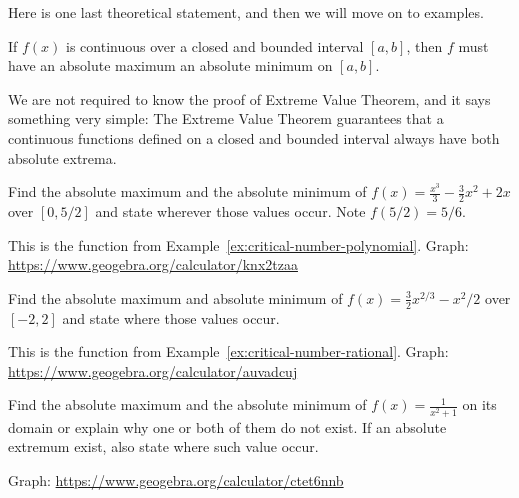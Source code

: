 \documentclass[../main.tex]{subfiles}
\begin{document}
  \medskip{}
  Here is one last theoretical statement, and then we will move on to examples. 

  \begin{mdframed}[style=withref-compact]
    If \(f(x)\) is continuous over a closed and bounded interval \([a,b]\), then \(f\) must have an absolute maximum  an absolute minimum on \([a,b]\).

  \end{mdframed}
  We are not required to know the proof of Extreme Value Theorem, and it says something very simple: The Extreme Value Theorem guarantees that a continuous functions defined on a closed and bounded interval always have both absolute extrema.
  \clearpage

  \begin{example} \label{ex:closed-interval-method-intro}
    Find the absolute maximum and the absolute minimum of \(f(x) = \frac{x^{3}}{3} - \frac{3}{2}x^{2} + 2x\) over \([0,5/2]\) and state wherever those values occur. Note \(f(5/2) = 5/6\).

    This is the function from Example~\ref{ex:critical-number-polynomial}. Graph: \url{https://www.geogebra.org/calculator/knx2tzaa}

  \end{example}

  \begin{example} 
    Find the absolute maximum and absolute minimum of \(f(x) = \frac{3}{2} x^{2/3} - x^{2}/2\) over \([-2,2]\) and state where those values occur.

    This is the function from Example~\ref{ex:critical-number-rational}. Graph: \url{https://www.geogebra.org/calculator/auvadcuj}

  \end{example}
  \clearpage

  \begin{example} \label{ex:extremum-open-interval}
    Find the absolute maximum and the absolute minimum of \(f(x) = \frac{1}{x^{2}+1}\) on its domain or explain why one or both of them do not exist. If an absolute extremum exist, also state where such value occur.

    Graph: \url{https://www.geogebra.org/calculator/ctet6nnb}

  \end{example}
\end{document}
